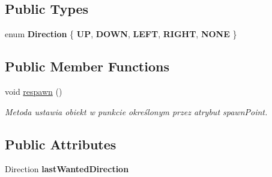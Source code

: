 \subsection*{Public Types}
\begin{DoxyCompactItemize}
\item 
\mbox{\label{classDynamicObject_a30add874b8507ddd3469e5f9144e8a58}} 
enum {\bfseries Direction} \{ \newline
{\bfseries UP}, 
{\bfseries D\+O\+WN}, 
{\bfseries L\+E\+FT}, 
{\bfseries R\+I\+G\+HT}, 
\newline
{\bfseries N\+O\+NE}
 \}
\end{DoxyCompactItemize}
\subsection*{Public Member Functions}
\begin{DoxyCompactItemize}
\item 
\mbox{\label{classDynamicObject_a81829b0b8ee1c8f1b7836522ffa41080}} 
void \hyperlink{classDynamicObject_a81829b0b8ee1c8f1b7836522ffa41080}{respawn} ()
\begin{DoxyCompactList}\small\item\em Metoda ustawia obiekt w punkcie określonym przez atrybut spawn\+Point. \end{DoxyCompactList}\end{DoxyCompactItemize}
\subsection*{Public Attributes}
\begin{DoxyCompactItemize}
\item 
\mbox{\label{classDynamicObject_ac3934eeb8931556f9dce6d988ab00c6e}} 
Direction {\bfseries last\+Wanted\+Direction}
\end{DoxyCompactItemize}
